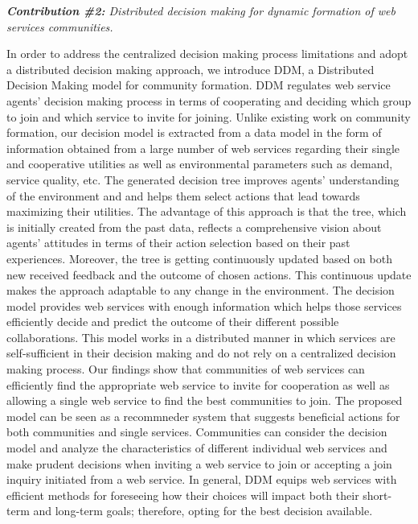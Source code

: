 \noindent \emph{\textbf{Contribution \#2:} Distributed decision making for dynamic formation of web services communities.}

In order to address the centralized decision making process limitations and adopt a distributed decision making approach, we introduce DDM, a Distributed Decision Making model for community formation. DDM regulates web service agents' decision making process in terms of cooperating and deciding which group to join and which service to invite for joining. Unlike existing work on community formation, our decision model is extracted from a data model in the form of information obtained from a large number of web services regarding their single and cooperative utilities as well as environmental parameters such as demand, service quality, etc. The generated decision tree improves agents' understanding of the environment and and helps them select actions that lead towards maximizing their utilities. The advantage of this approach is that the tree, which is initially created from the past data, reflects a comprehensive vision about agents' attitudes in terms of their action selection based on their past experiences. Moreover, the tree is getting continuously updated based on both new received feedback and the outcome of chosen actions. This continuous update makes the approach adaptable to any change in the environment.
The decision model provides web services with enough information which helps those services efficiently decide and predict the outcome of their different possible collaborations. This model works in a distributed manner in which services are self-sufficient in their decision making and do not rely on a centralized decision making process. Our findings show that communities of web services can efficiently find the appropriate web service to invite for cooperation as well as allowing a single web service to find the best communities to join. The proposed model can be seen as a recommneder system that suggests beneficial actions for both communities and single services. Communities can consider the decision model and analyze the characteristics of different individual web services and make prudent decisions when inviting a web service to join or accepting a join inquiry initiated from a web service. In general, DDM equips web services with efficient methods for foreseeing how their choices will impact both their short-term and long-term goals; therefore, opting for the best decision available.

